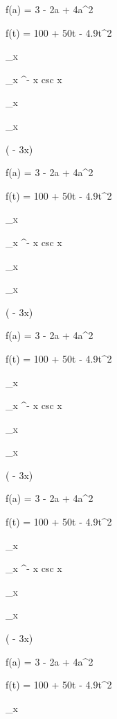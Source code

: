\documentclass[11pt,a4paper]{article}
\begin{document}
f(a) = 3 - 2a + 4a^2

f(t) = 100 + 50t - 4.9t^2

\lim_{x } 

\lim_{x \pi^-} x csc x

\lim_{x } 

\lim_{x } 

 

 ( - 3x)

f(a) = 3 - 2a + 4a^2

f(t) = 100 + 50t - 4.9t^2

\lim_{x } 

\lim_{x \pi^-} x csc x

\lim_{x } 

\lim_{x } 

 

 ( - 3x)

f(a) = 3 - 2a + 4a^2

f(t) = 100 + 50t - 4.9t^2

\lim_{x } 

\lim_{x \pi^-} x csc x

\lim_{x } 

\lim_{x } 

 

 ( - 3x)

f(a) = 3 - 2a + 4a^2

f(t) = 100 + 50t - 4.9t^2

\lim_{x } 

\lim_{x \pi^-} x csc x

\lim_{x } 

\lim_{x } 

 

 ( - 3x)

f(a) = 3 - 2a + 4a^2

f(t) = 100 + 50t - 4.9t^2

\lim_{x } 
\end{document}
